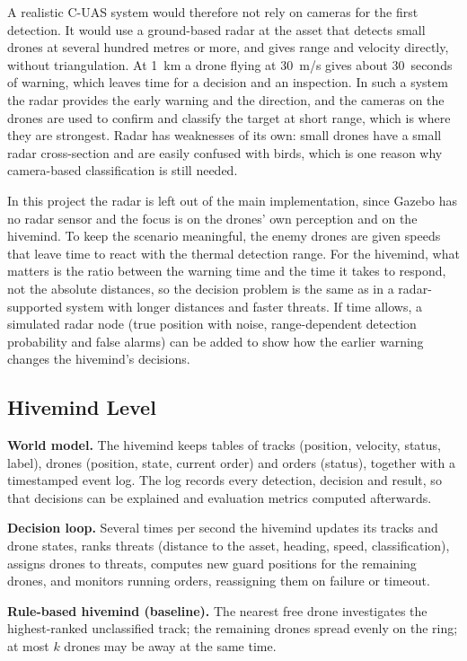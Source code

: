 \documentclass{article}
\begin{document}
A realistic C-UAS system would therefore not rely on cameras for the first
detection. It would use a ground-based radar at the asset that detects
small drones at several hundred metres or more, and gives range and
velocity directly, without triangulation. At 1~km a drone flying at 30~m/s
gives about 30~seconds of warning, which leaves time for a decision and an
inspection. In such a system the radar provides the early warning and the
direction, and the cameras on the drones are used to confirm and classify
the target at short range, which is where they are strongest. Radar has
weaknesses of its own: small drones have a small radar cross-section and
are easily confused with birds, which is one reason why camera-based
classification is still needed.

In this project the radar is left out of the main implementation, since
Gazebo has no radar sensor and the focus is on the drones' own perception
and on the hivemind. To keep the scenario meaningful, the enemy drones are
given speeds that leave time to react with the thermal detection range.
For the hivemind, what matters is the ratio between the warning time and
the time it takes to respond, not the absolute distances, so the decision
problem is the same as in a radar-supported system with longer distances
and faster threats. If time allows, a simulated radar node (true position
with noise, range-dependent detection probability and false alarms) can be
added to show how the earlier warning changes the hivemind's decisions.

\subsection{Hivemind Level}
\textbf{World model.} The hivemind keeps tables of tracks (position,
velocity, status, label), drones (position, state, current order) and
orders (status), together with a timestamped event log. The log records
every detection, decision and result, so that decisions can be explained
and evaluation metrics computed afterwards.

\textbf{Decision loop.} Several times per second the hivemind updates its
tracks and drone states, ranks threats (distance to the asset, heading,
speed, classification), assigns drones to threats, computes new guard
positions for the remaining drones, and monitors running orders, reassigning
them on failure or timeout.

\textbf{Rule-based hivemind (baseline).} The nearest free drone investigates
the highest-ranked unclassified track; the remaining drones spread evenly
on the ring; at most $k$ drones may be away at the same time.
\end{document}
